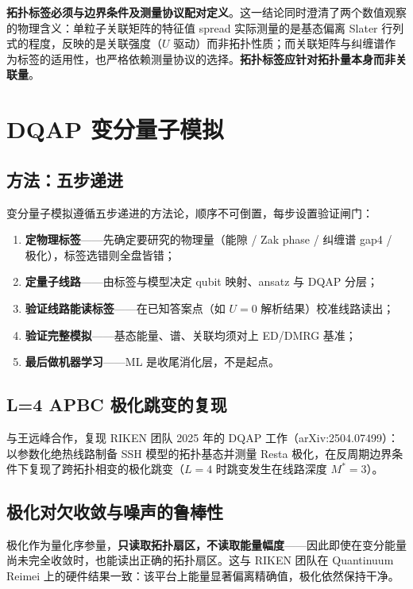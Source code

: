 \documentclass[11pt,a4paper]{article}
\begin{document}
\textbf{拓扑标签必须与边界条件及测量协议配对定义}。这一结论同时澄清了两个数值观察的物理含义：单粒子关联矩阵的特征值 spread 实际测量的是基态偏离 Slater 行列式的程度，反映的是关联强度（$U$ 驱动）而非拓扑性质；而关联矩阵与纠缠谱作为标签的适用性，也严格依赖测量协议的选择。\textbf{拓扑标签应针对拓扑量本身而非关联量}。

\section{DQAP 变分量子模拟}

\subsection{方法：五步递进}

变分量子模拟遵循五步递进的方法论，顺序不可倒置，每步设置验证闸门：

\begin{enumerate}
  \item \textbf{定物理标签}——先确定要研究的物理量（能隙 / Zak phase / 纠缠谱 gap4 / 极化），标签选错则全盘皆错；
  \item \textbf{定量子线路}——由标签与模型决定 qubit 映射、ansatz 与 DQAP 分层；
  \item \textbf{验证线路能读标签}——在已知答案点（如 $U=0$ 解析结果）校准线路读出；
  \item \textbf{验证完整模拟}——基态能量、谱、关联均须对上 ED/DMRG 基准；
  \item \textbf{最后做机器学习}——ML 是收尾消化层，不是起点。
\end{enumerate}

\subsection{L=4 APBC 极化跳变的复现}

与王远峰合作，复现 RIKEN 团队 2025 年的 DQAP 工作（arXiv:2504.07499）：以参数化绝热线路制备 SSH 模型的拓扑基态并测量 Resta 极化，在反周期边界条件下复现了跨拓扑相变的极化跳变（$L=4$ 时跳变发生在线路深度 $M^*=3$）。

\subsection{极化对欠收敛与噪声的鲁棒性}

极化作为量化序参量，\textbf{只读取拓扑扇区，不读取能量幅度}——因此即使在变分能量尚未完全收敛时，也能读出正确的拓扑扇区。这与 RIKEN 团队在 Quantinuum Reimei 上的硬件结果一致：该平台上能量显著偏离精确值，极化依然保持干净。
\end{document}
